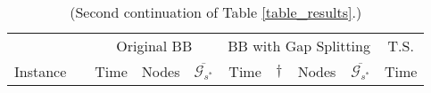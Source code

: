 \documentclass[11.5pt]{article}
\begin{document}
 \begin{table}[H]
\centering
\caption{(Second continuation of Table \ref{table_results}.)}\label{table_results3}
\begin{tabular}{l|l|rrr|rrrr|r}
\toprule
 &  & \multicolumn{3}{c}{Original BB}  & \multicolumn{4}{c}{BB with Gap Splitting} %
 & \multicolumn{1}{c}{ T.S.} 	\\ 
\cmidrule(r){3-5}
\cmidrule(r){6-9}
\cmidrule(r){10-10}
Instance &  & Time & Nodes & $\overline{\mathcal{G}_{s^*}}$ & Time & $\dagger$ & Nodes & $\overline{\mathcal{G}_{s^*}}$& Time \\
\midrule

\end{tabular}
\end{table}
\end{document}
